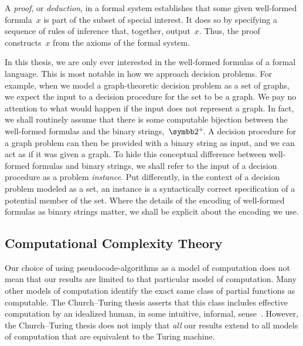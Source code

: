A \emph{proof}, or \emph{deduction}, in a formal system establishes that some given well-formed formula~$x$ is part of the subset of special interest.
It does so by specifying a sequence of rules of inference that, together, output~$x$.
Thus, the proof constructs~$x$ from the axioms of the formal system.

In this thesis, we are only ever interested in the well-formed formulas of a formal language.
This is most notable in how we approach decision problems.
For example, when we model a graph-theoretic decision problem as a set of graphs, we expect the input to a decision procedure for the set to be a graph.
We pay no attention to what would happen if the input does not represent a graph.
In fact, we shall routinely assume that there is some computable bijection between the well-formed formulas and the binary strings,~$\binary^+\!$.
A decision procedure for a graph problem can then be provided with a binary string as input, and we can act as if it was given a graph.
To hide this conceptual difference between well-formed formulas and binary strings, we shall refer to the input of a decision procedure as a problem \emph{instance}.
Put differently, in the context of a decision problem modeled as a set, an instance is a syntactically correct specification of a potential member of the set.
Where the details of the encoding of well-formed formulas as binary strings matter, we shall be explicit about the encoding we use.


\subsection{Computational Complexity Theory}

Our choice of using pseudocode-algorithms as a model of computation does not mean that our results are limited to that particular model of computation.
Many other models of computation identify the exact same class of partial functions as computable.
The Church--Turing thesis asserts that this class includes effective computation by an idealized human, in some intuitive, informal, sense~\parencite{vanemdeboas1990machine,goldreich2008computational}.
However, the Church--Turing thesis does not imply that \emph{all} our results extend to all models of computation that are equivalent to the Turing machine.

